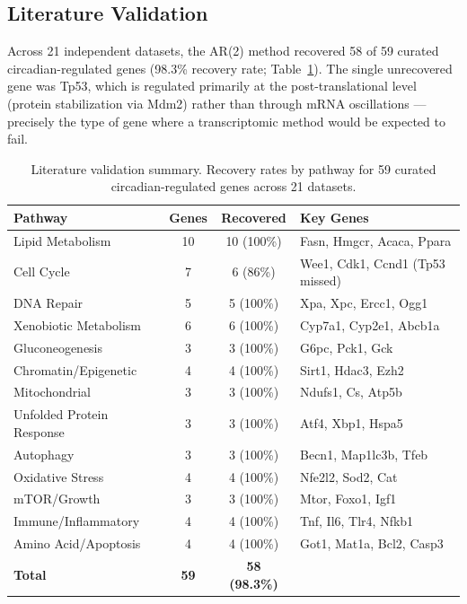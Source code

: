 \documentclass[11pt,letterpaper]{article}
\begin{document}
\subsection{Literature Validation}
\label{sec:litval-results}

Across 21 independent datasets, the AR(2) method recovered 58 of 59 curated circadian-regulated genes (98.3\% recovery rate; Table~\ref{tab:literature}). The single unrecovered gene was Tp53, which is regulated primarily at the post-translational level (protein stabilization via Mdm2) rather than through mRNA oscillations \citep{fu2003circadian}---precisely the type of gene where a transcriptomic method would be expected to fail.

\begin{table}[H]
\centering
\caption{Literature validation summary. Recovery rates by pathway for 59 curated circadian-regulated genes across 21 datasets.}
\label{tab:literature}
\begin{tabular}{lccl}
\toprule
\textbf{Pathway} & \textbf{Genes} & \textbf{Recovered} & \textbf{Key Genes} \\
\midrule
Lipid Metabolism & 10 & 10 (100\%) & Fasn, Hmgcr, Acaca, Ppara \\
Cell Cycle & 7 & 6 (86\%) & Wee1, Cdk1, Ccnd1 (Tp53 missed) \\
DNA Repair & 5 & 5 (100\%) & Xpa, Xpc, Ercc1, Ogg1 \\
Xenobiotic Metabolism & 6 & 6 (100\%) & Cyp7a1, Cyp2e1, Abcb1a \\
Gluconeogenesis & 3 & 3 (100\%) & G6pc, Pck1, Gck \\
Chromatin/Epigenetic & 4 & 4 (100\%) & Sirt1, Hdac3, Ezh2 \\
Mitochondrial & 3 & 3 (100\%) & Ndufs1, Cs, Atp5b \\
Unfolded Protein Response & 3 & 3 (100\%) & Atf4, Xbp1, Hspa5 \\
Autophagy & 3 & 3 (100\%) & Becn1, Map1lc3b, Tfeb \\
Oxidative Stress & 4 & 4 (100\%) & Nfe2l2, Sod2, Cat \\
mTOR/Growth & 3 & 3 (100\%) & Mtor, Foxo1, Igf1 \\
Immune/Inflammatory & 4 & 4 (100\%) & Tnf, Il6, Tlr4, Nfkb1 \\
Amino Acid/Apoptosis & 4 & 4 (100\%) & Got1, Mat1a, Bcl2, Casp3 \\
\midrule
\textbf{Total} & \textbf{59} & \textbf{58 (98.3\%)} & \\
\bottomrule
\end{tabular}
\end{table}
\end{document}
